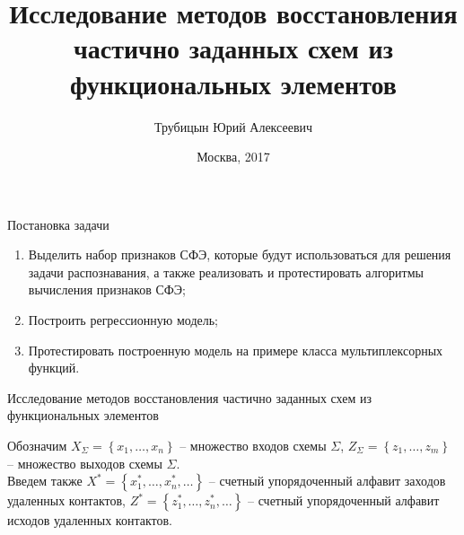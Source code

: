 \documentclass[serif,utf8]{beamer}
\begin{document}

\title[Восстановление частичных СФЭ]{Исследование методов восстановления частично заданных схем из функциональных элементов}
\author[Трубицын Ю. А.]{Трубицын Юрий Алексеевич}
\date{Москва, 2017}


\begin{frame}
\maketitle
\end{frame}


\begin{frame}{Постановка задачи}
\begin{enumerate}
    [default]
	\item Выделить набор признаков СФЭ, которые будут использоваться для решения задачи распознавания, а также реализовать и протестировать алгоритмы вычисления признаков СФЭ;
	\item Построить регрессионную модель;
	\item Протестировать построенную модель на примере класса мультиплексорных функций. 
\end{enumerate}

\end{frame}


\begin{frame}{Исследование методов восстановления частично заданных схем из функциональных элементов}

Обозначим $X_{\scriptscriptstyle{\Sigma}} = \left\{ x_1, \dots, x_n\right\}$ -- множество входов схемы $\Sigma$, $Z_{\scriptscriptstyle{\Sigma}} = \left\{z_1, \dots , z_m\right\}$ -- множество выходов схемы $\Sigma$.\\
Введем также $X^{\ast} = \left\{ x^{\ast}_1, \dots, x^{\ast}_n, \dots \right\}$ -- счетный упорядоченный алфавит заходов удаленных контактов,
$Z^{\ast} = \left\{ z^{\ast}_1, \dots, z^{\ast}_n, \dots \right\}$ -- счетный упорядоченный алфавит исходов удаленных контактов.
\end{frame}
\end{document}
